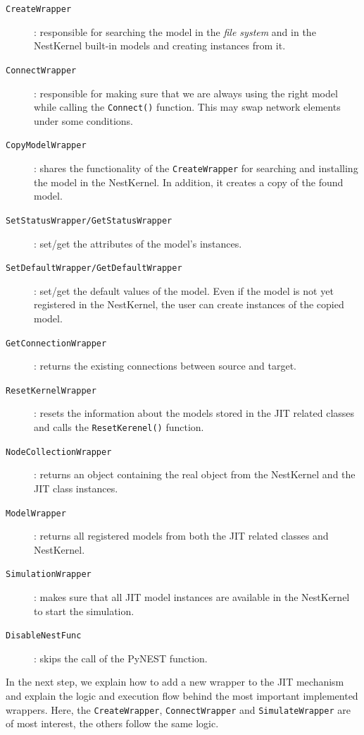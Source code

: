 \begin{description}
   \item[\mdseries\texttt{CreateWrapper}]: responsible for searching the model in the \emph{file system} and in the NestKernel built-in models and creating instances from it.
   \item[\mdseries\texttt{ConnectWrapper}]: responsible for making sure that we are always using the right model while calling the \texttt{Connect()} function. This may swap network elements under some conditions.
   \item[\mdseries\texttt{CopyModelWrapper}]: shares the functionality of the \texttt{CreateWrapper} for searching and installing the model in the NestKernel. In addition, it creates a copy of the found model.
   \item[\mdseries\texttt{SetStatusWrapper{\normalfont/}GetStatusWrapper}]: set/get the attributes of the model's instances.
   \item[\mdseries\texttt{SetDefaultWrapper{\normalfont/}GetDefaultWrapper}]: set/get the default values of the model. Even if the model is not yet registered in the NestKernel, the user can create instances of the copied model.
   \item[\mdseries\texttt{GetConnectionWrapper}]: returns the existing connections between source and target.
   \item[\mdseries\texttt{ResetKernelWrapper}]: resets the information about the models stored in the JIT related classes and calls the \texttt{ResetKerenel()} function.
   \item[\mdseries\texttt{NodeCollectionWrapper}]: returns an object containing the real object from the NestKernel and the JIT class instances.
   \item[\mdseries\texttt{ModelWrapper}]: returns all registered models from both the JIT related classes and NestKernel.
   \item[\mdseries\texttt{SimulationWrapper}]: makes sure that all JIT model instances are available in the NestKernel to start the simulation.
   \item[\mdseries\texttt{DisableNestFunc}]: skips the call of the PyNEST function.
\end{description}

   In the next step, we explain how to add a new wrapper to the JIT mechanism and explain the logic and execution flow behind the most important implemented wrappers. Here, the \texttt{CreateWrapper}, \texttt{ConnectWrapper} and \texttt{SimulateWrapper} are of most interest, the others follow the same logic.

